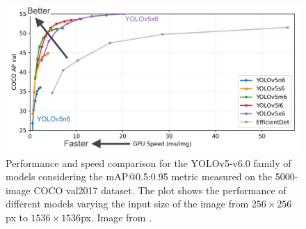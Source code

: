 \begin{figure}
	\centering

    \begin{center}
        \includegraphics[width=0.9\columnwidth]{images/yolov5-sizes.png}
    \end{center}

	\caption{Performance and speed comparison for the YOLOv5-v6.0 family of models considering the mAP@0.5:0.95 metric measured on the 5000-image COCO val2017 \cite{lin2014microsoft} dataset. The plot shows the performance of different models varying the input size of the image from $256 \times 256$px to $1536 \times 1536$px. Image from \cite{glenn_jocher_2021_5563715}.}
	\label{fig:yolo-sizes}%
\end{figure}


